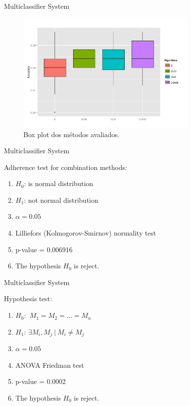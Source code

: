 \documentclass{beamer}
\begin{document}
\begin{frame}{Multiclassifier System}
\begin{figure}[!h]
\centering
\includegraphics[width=3.5in]{../out/boxplot-errors.png}
\caption{Box plot dos métodos avaliados.}
\label{fig:boxplot_acc}
\end{figure} 
\end{frame}


\begin{frame}{Multiclassifier System}

Adherence test for combination methods: 
\begin{enumerate}
\item $H_0$: is normal distribution
\item $H_1$: not normal distribution
\item $\alpha = 0.05$
\item Lilliefors (Kolmogorov-Smirnov) normality test
\item p-value = 0.006916
\item The hypothesis $H_0$ is reject.
\end{enumerate}
\end{frame}


\begin{frame}{Multiclassifier System}

Hypothesis test:
\begin{enumerate}
\item $H_0$: $\ M_1 = M_2 = ... =M_n$
\item $H_1$: $\exists M_i,M_j \ | \ M_i\neq M_j$
\item $\alpha = 0.05$
\item ANOVA Friedman test
\item p-value = 0.0002
\item The hypothesis $H_0$ is reject.
\end{enumerate}



\end{frame}
\end{document}
